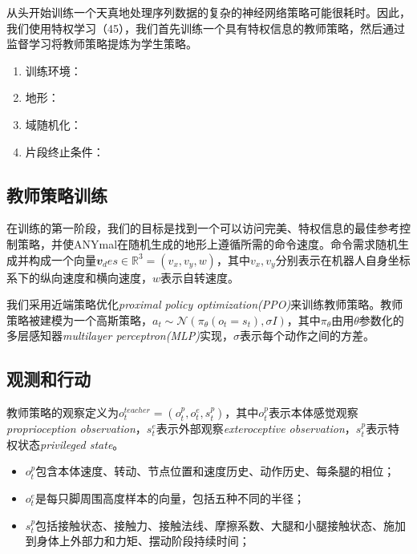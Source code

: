   从头开始训练一个天真地处理序列数据的复杂的神经网络策略可能很耗时\cite[p]{Lee_Hwangbo_Wellhausen_Koltun_Hutter_2020}。因此，我们使用特权学习（45），我们首先训练一个具有特权信息的教师策略，然后通过监督学习将教师策略提炼为学生策略\cite[p]{Chen_Zhou_Koltun_Krähenbühl_2019}。
  
  \begin{enumerate}
    \item 训练环境：
    \item 地形：
    \item 域随机化：
    \item 片段终止条件：
  \end{enumerate}
  
  \subsection[教师策略训练]{教师策略训练}
  
  在训练的第一阶段，我们的目标是找到一个可以访问完美、特权信息的最佳参考控制策略，并使ANYmal在随机生成的地形上遵循所需的命令速度。命令需求随机生成并构成一个向量$\mathbfit{v}_des\in \mathbb{R}^3=(v_x,v_y,w)$，其中$v_x, v_y$分别表示在机器人自身坐标系下的纵向速度和横向速度，$w$表示自转速度。
  
  我们采用近端策略优化\emph{proximal policy optimization(PPO)}\cite[p]{Schulman_Wolski_Dhariwal_Radford_Klimov_2017}来训练教师策略。教师策略被建模为一个高斯策略，$a_t \sim \mathcal{N}(\pi_{\theta}(o_t=s_t),\sigma I)$，其中$\pi_{\theta}$由用$\theta$参数化的多层感知器\emph{multilayer perceptron(MLP)}实现，$\sigma$表示每个动作之间的方差。
  
  \subsection[观测和行动]{观测和行动}
  
  教师策略的观察定义为$o_t^{teacher}=(o_t^p, o_t^e, s_t^p)$，其中$o_t^p$表示本体感觉观察\emph{proprioception observation}，$s_t^e$表示外部观察\emph{exteroceptive observation}，$s_t^p$表示特权状态\emph{privileged state}。
  \begin{itemize}
    \item $o_t^p$包含本体速度、转动、节点位置和速度历史、动作历史、每条腿的相位；
    \item $o_t^e$是每只脚周围高度样本的向量，包括五种不同的半径；
    \item $s_t^p$包括接触状态、接触力、接触法线、摩擦系数、大腿和小腿接触状态、施加到身体上外部力和力矩、摆动阶段持续时间；
  \end{itemize}
  
